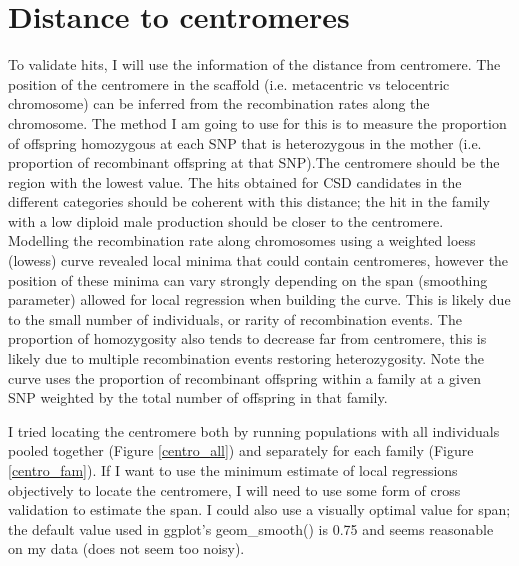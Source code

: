 \documentclass[10pt,a4paper]{report}
\begin{document}
\FloatBarrier
\section{Distance to centromeres}

To validate hits, I will use the information of the distance from centromere. The position of the centromere in the scaffold (i.e. metacentric vs telocentric chromosome) can be inferred from the recombination rates along the chromosome. The method I am going to use for this is to measure the proportion of offspring homozygous at each SNP that is heterozygous in the mother (i.e. proportion of recombinant offspring at that SNP).The centromere should be the region with the lowest value.
The hits obtained for CSD candidates in the different categories should be coherent with this distance; the hit in the family with a low diploid male production should be closer to the centromere.\\

Modelling the recombination rate along chromosomes using a weighted loess (lowess) curve revealed local minima that could contain centromeres, however the position of these minima can vary strongly depending on the span (smoothing parameter) allowed for local regression when building the curve. This is likely due to the small number of individuals, or rarity of recombination events. The proportion of homozygosity also tends to decrease far from centromere, this is likely due to multiple recombination events restoring heterozygosity. Note the curve uses the proportion of recombinant offspring within a family at a given SNP weighted by the total number of offspring in that family.

I tried locating the centromere both by running populations with all individuals pooled together (Figure \ref{centro_all}) and separately for each family (Figure \ref{centro_fam}). If I want to use the minimum estimate of local regressions objectively to locate the centromere, I will need to use some form of cross validation to estimate the span. I could also use a visually optimal value for span; the default value used in ggplot's geom\_smooth() is 0.75 and seems reasonable on my data (does not seem too noisy).\\
\end{document}
